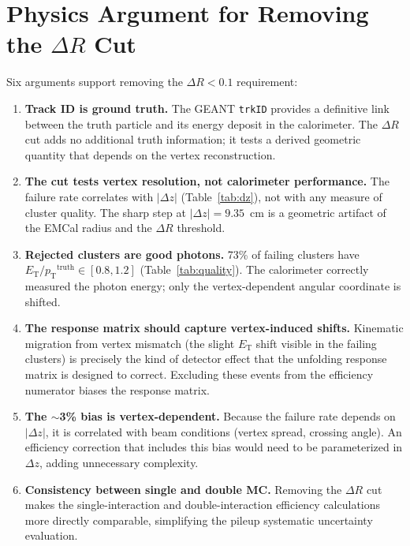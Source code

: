 \documentclass[11pt,letterpaper]{article}
\newcommand{\DR}{\ensuremath{\Delta R}}
\newcommand{\pT}{\ensuremath{p_{\text{T}}}}
\newcommand{\ET}{\ensuremath{E_{\text{T}}}}
\begin{document}
\section{\texorpdfstring{Physics Argument for Removing the $\DR$ Cut}{Physics Argument for Removing the Delta R Cut}}
\label{sec:argument}

Six arguments support removing the $\DR < 0.1$ requirement:

\begin{enumerate}
  \item \textbf{Track ID is ground truth.} The GEANT \texttt{trkID} provides
    a definitive link between the truth particle and its energy deposit in the
    calorimeter. The $\DR$ cut adds no additional truth information; it tests
    a derived geometric quantity that depends on the vertex reconstruction.

  \item \textbf{The cut tests vertex resolution, not calorimeter performance.}
    The failure rate correlates with $|\Delta z|$ (Table~\ref{tab:dz}),
    not with any measure of cluster quality. The sharp step at
    $|\Delta z| = 9.35$~cm is a geometric artifact of the EMCal radius and the
    $\DR$ threshold.

  \item \textbf{Rejected clusters are good photons.} 73\% of failing clusters
    have $\ET / \pT^{\text{truth}} \in [0.8, 1.2]$
    (Table~\ref{tab:quality}). The calorimeter correctly measured the photon
    energy; only the vertex-dependent angular coordinate is shifted.

  \item \textbf{The response matrix should capture vertex-induced shifts.}
    Kinematic migration from vertex mismatch (the slight $\ET$ shift visible
    in the failing clusters) is precisely the kind of detector effect that the
    unfolding response matrix is designed to correct. Excluding these events
    from the efficiency numerator biases the response matrix.

  \item \textbf{The $\sim$3\% bias is vertex-dependent.} Because the failure
    rate depends on $|\Delta z|$, it is correlated with beam conditions
    (vertex spread, crossing angle). An efficiency correction that includes
    this bias would need to be parameterized in $\Delta z$, adding unnecessary
    complexity.

  \item \textbf{Consistency between single and double MC.} Removing the $\DR$
    cut makes the single-interaction and double-interaction efficiency
    calculations more directly comparable, simplifying the pileup systematic
    uncertainty evaluation.
\end{enumerate}
\end{document}
